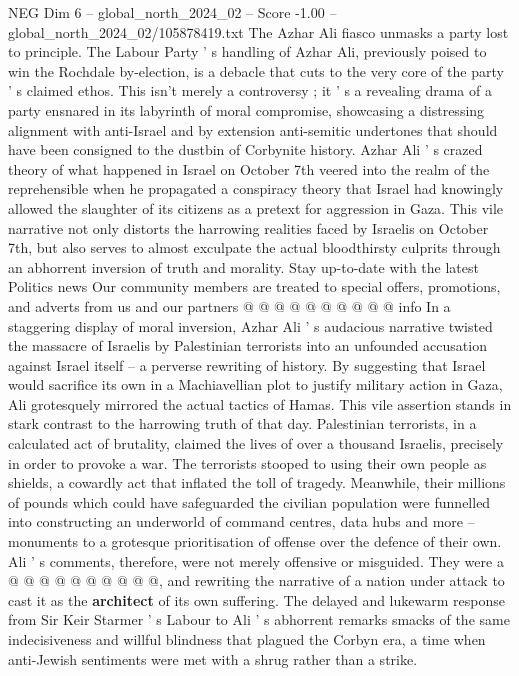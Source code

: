 \begin{textsample}{NEG Dim 6 – global\_north\_2024\_02 – Score -1.00 – global\_north\_2024\_02/105878419.txt}  \label{ex:f6_neg_246}
The Azhar Ali fiasco unmasks a party lost to principle.
The Labour Party ' s handling of Azhar Ali, previously poised to win the Rochdale by-election, is a debacle that cuts to the very core of the party ' s claimed ethos.
This isn't merely a controversy ; it ' s a revealing drama of a party ensnared in its labyrinth of moral compromise, showcasing a distressing alignment with anti-Israel and by extension anti-semitic undertones that should have been consigned to the dustbin of Corbynite history.
Azhar Ali ' s crazed theory of what happened in Israel on October 7th veered into the realm of the reprehensible when he propagated a conspiracy theory that Israel had knowingly allowed the slaughter of its citizens as a pretext for aggression in Gaza.
This vile narrative not only distorts the harrowing realities faced by Israelis on October 7th, but also serves to almost exculpate the actual bloodthirsty culprits through an abhorrent inversion of truth and morality.
Stay up-to-date with the latest Politics news Our community members are treated to special offers, promotions, and adverts from us and our partners @ @ @ @ @ @ @ @ @ @ info In a staggering display of moral inversion, Azhar Ali ' s audacious narrative twisted the massacre of Israelis by Palestinian terrorists into an unfounded accusation against Israel itself -- a perverse rewriting of history.
By suggesting that Israel would sacrifice its own in a Machiavellian plot to justify military action in Gaza, Ali grotesquely mirrored the actual tactics of Hamas.
This vile assertion stands in stark contrast to the harrowing truth of that day.
Palestinian terrorists, in a calculated act of brutality, claimed the lives of over a thousand Israelis, precisely in order to provoke a war.
The terrorists stooped to using their own people as shields, a cowardly act that inflated the toll of tragedy.
Meanwhile, their millions of pounds which could have safeguarded the civilian population were funnelled into constructing an underworld of command centres, data hubs and more -- monuments to a grotesque prioritisation of offense over the defence of their own.
Ali ' s comments, therefore, were not merely offensive or misguided.
They were a @ @ @ @ @ @ @ @ @ @, and rewriting the narrative of a nation under attack to cast it as the \textbf{architect} of its own suffering.
The delayed and lukewarm response from Sir Keir Starmer ' s Labour to Ali ' s abhorrent remarks smacks of the same indecisiveness and willful blindness that plagued the Corbyn era, a time when anti-Jewish sentiments were met with a shrug rather than a strike.

\end{textsample}
